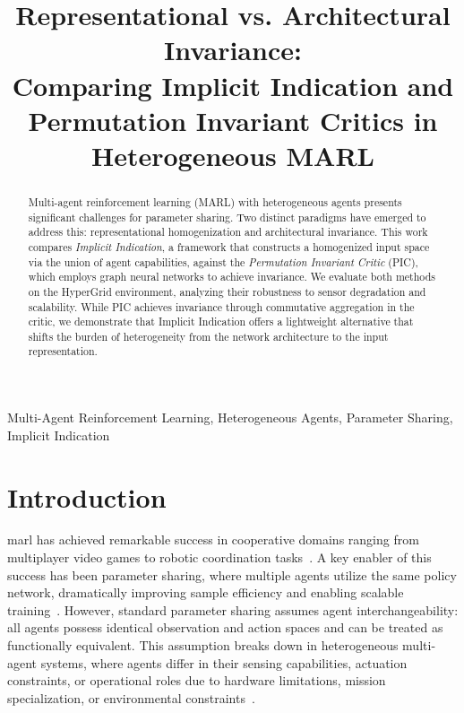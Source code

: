 \documentclass[conference]{IEEEtran}
\begin{document}
\title{
    Representational vs. Architectural Invariance: \\ 
    Comparing Implicit Indication and Permutation Invariant Critics in Heterogeneous MARL
}

\author{
}

\maketitle

\begin{abstract}
Multi-agent reinforcement learning (MARL) with heterogeneous agents presents 
significant challenges for parameter sharing. 
Two distinct paradigms have emerged to address this: 
representational homogenization and architectural invariance. 
This work compares \textit{Implicit Indication}, 
a framework that constructs a homogenized input space 
via the union of agent capabilities, against the \textit{Permutation Invariant Critic} (PIC), 
which employs graph neural networks to achieve invariance. 
We evaluate both methods on the HyperGrid environment, 
analyzing their robustness to sensor degradation and scalability. 
While PIC achieves invariance through commutative aggregation in the critic, 
we demonstrate that Implicit Indication offers a lightweight alternative 
that shifts the burden of heterogeneity from the network architecture to the input representation.
\end{abstract}

\begin{IEEEkeywords}
Multi-Agent Reinforcement Learning, Heterogeneous Agents, Parameter Sharing, Implicit Indication
\end{IEEEkeywords}


\section{Introduction}

\Gls{marl} has achieved remarkable success in cooperative 
domains ranging from multiplayer video games to robotic coordination tasks~\cite{albrecht2024}. 
A key enabler of this success has been parameter sharing, where multiple agents utilize the 
same policy network, dramatically improving sample efficiency and enabling scalable 
training~\cite{gupta2017, terry2020}. However, standard parameter sharing assumes 
agent interchangeability: all agents possess identical observation and action spaces 
and can be treated as functionally equivalent. This assumption breaks down in 
heterogeneous multi-agent systems, where agents differ in their sensing capabilities, 
actuation constraints, or operational roles due to hardware limitations, 
mission specialization, or environmental constraints~\cite{calvo2018, cao2012}.
\end{document}
